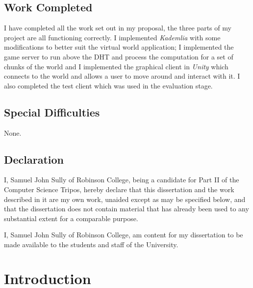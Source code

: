 \documentclass[10pt,twoside,notitlepage,a4paper]{report}
\newcommand{\unity}{\emph{Unity}}
\newcommand{\kademlia}{\emph{Kademlia}}
\begin{document}
	\section*{Work Completed}
	I have completed all the work set out in my proposal, the three parts of my project are all functioning correctly. I implemented \kademlia{} with some modifications to better suit the virtual world application; I implemented the game server to run above the DHT and process the computation for a set of chunks of the world and I implemented the graphical client in \unity{} which connects to the world and allows a user to move around and interact with it. I also completed the test client which was used in the evaluation stage.
	
	\section*{Special Difficulties}
	None.
	
	\newpage
	\section*{Declaration}
	
	I, Samuel John Sully of Robinson College, being a candidate for Part II of the Computer
	Science Tripos, hereby declare that this dissertation and the work described in it are
	my own work, unaided except as may be specified below, and that the dissertation does
	not contain material that has already been used to any substantial extent for a comparable
	purpose.
	
	\bigskip
	
	\noindent I, Samuel John Sully of Robinson College, am content for my dissertation to be made available to the students and staff of the University.
	
	\cleardoublepage
	
	\tableofcontents
	
	\listoffigures
	
	\listoftables
	
	\listofalgorithms
	
	\newpage

	\cleardoublepage
	
	\setcounter{page}{1}
	\pagestyle{headings}
	
	\chapter{Introduction}
	
\end{document}
